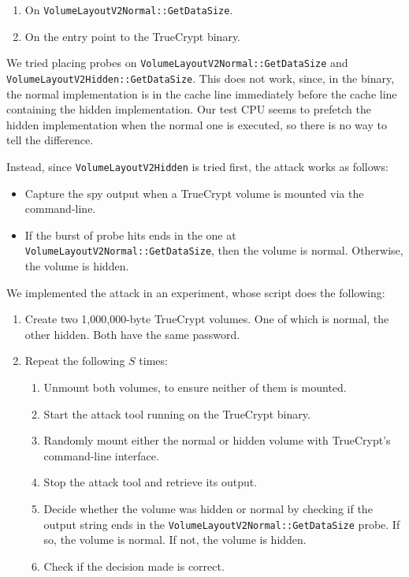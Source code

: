 \documentclass{acm_proc_article-sp}
\begin{document}
\begin{enumerate}
    \item On \texttt{VolumeLayoutV2Normal::GetDataSize}.
    \item On the entry point to the TrueCrypt binary.
\end{enumerate}

We tried placing probes on \texttt{VolumeLayoutV2Normal::GetDataSize} and
\texttt{VolumeLayoutV2Hidden::GetDataSize}. This does not work, since, in the
binary, the normal implementation is in the cache line immediately before the
cache line containing the hidden implementation. Our test CPU seems to prefetch
the hidden implementation when the normal one is executed, so there is no way to
tell the difference.

Instead, since \texttt{VolumeLayoutV2Hidden} is tried first, the attack works as
follows:

\begin{itemize}
    \item Capture the spy output when a TrueCrypt volume is mounted via the
          command-line.
      \item If the burst of probe hits ends in the one at
          \texttt{VolumeLayoutV2Normal::GetDataSize}, then the volume is normal.
          Otherwise, the volume is hidden.
\end{itemize}

We implemented the attack in an experiment, whose script does the following:

\begin{enumerate}
    \item Create two 1,000,000-byte TrueCrypt volumes. One of which is normal,
        the other hidden. Both have the same password.
    \item Repeat the following $S$ times:
        \begin{enumerate}
            \item Unmount both volumes, to ensure neither of them is mounted.
            \item Start the attack tool running on the TrueCrypt binary.
            \item Randomly mount either the normal or hidden volume with
                  TrueCrypt's command-line interface.
            \item Stop the attack tool and retrieve its output.
            \item Decide whether the volume was hidden or normal by checking if
                the output string ends in the
                \texttt{VolumeLayoutV2Normal::GetDataSize} probe. If so, the
                volume is normal. If not, the volume is hidden.
            \item Check if the decision made is correct.
        \end{enumerate}
\end{enumerate}
\end{document}
